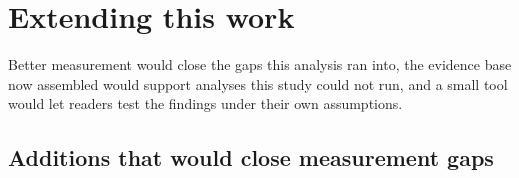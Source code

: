 \section{Extending this work}
\label{sec:next}

Better measurement would close the gaps this analysis ran into, the evidence
base now assembled would support analyses this study could not run, and a small
tool would let readers test the findings under their own assumptions.

\subsection*{Additions that would close measurement gaps}

